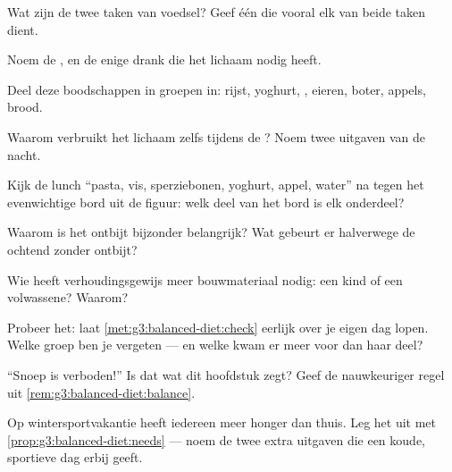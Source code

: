 \begin{exercise}[$\star$]\label{exo:g3:balanced-diet:1}
Wat zijn de twee taken van voedsel? Geef één  die vooral
elk van beide taken dient.
\end{exercise}

\begin{exercise}[$\star$]\label{exo:g3:balanced-diet:2}
Noem de , en de enige drank die het lichaam nodig heeft.
\end{exercise}

\begin{exercise}[$\star$]\label{exo:g3:balanced-diet:3}
Deel deze boodschappen in groepen in: rijst, yoghurt, , eieren,
boter, appels, brood.
\end{exercise}

\begin{exercise}[$\star$]\label{exo:g3:balanced-diet:4}
Waarom verbruikt het lichaam zelfs tijdens de  ? Noem twee
uitgaven van de nacht.
\end{exercise}

\begin{exercise}[$\star$]\label{exo:g3:balanced-diet:5}
Kijk de lunch ``pasta, vis, sperziebonen, yoghurt, appel, water'' na
tegen het evenwichtige bord uit de figuur: welk deel van het bord is
elk onderdeel?
\end{exercise}

\begin{exercise}[$\star$]\label{exo:g3:balanced-diet:6}
Waarom is het ontbijt bijzonder belangrijk? Wat gebeurt er halverwege
de ochtend zonder ontbijt?
\end{exercise}

\begin{exercise}[$\star$]\label{exo:g3:balanced-diet:7}
Wie heeft verhoudingsgewijs meer bouwmateriaal nodig: een kind of een
volwassene? Waarom?
\end{exercise}

\begin{exercise}[$\star$]\label{exo:g3:balanced-diet:8}
Probeer het: laat \cref{met:g3:balanced-diet:check} eerlijk over je
eigen dag lopen. Welke groep ben je vergeten --- en welke kwam er meer
voor dan haar deel?
\end{exercise}

\begin{exercise}[$\star\star$]\label{exo:g3:balanced-diet:9}
``Snoep is verboden!'' Is dat wat dit hoofdstuk zegt? Geef de
nauwkeuriger regel uit \cref{rem:g3:balanced-diet:balance}.
\end{exercise}

\begin{exercise}[$\star\star$]\label{exo:g3:balanced-diet:10}
Op wintersportvakantie heeft iedereen meer honger dan thuis. Leg het
uit met \cref{prop:g3:balanced-diet:needs} --- noem de twee extra
uitgaven die een koude, sportieve dag erbij geeft.
\end{exercise}
